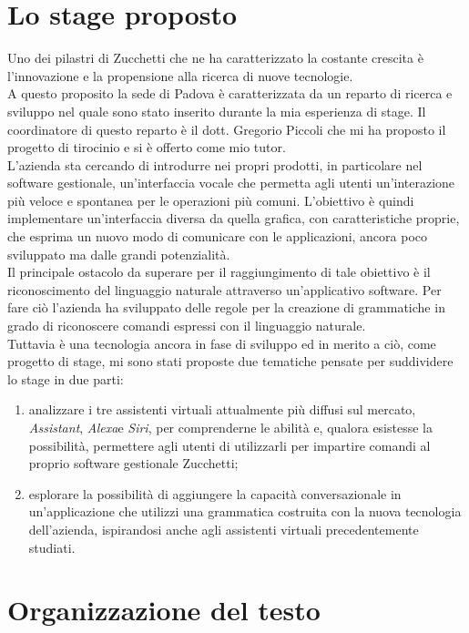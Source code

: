 \section{Lo stage proposto}
Uno dei pilastri di Zucchetti che ne ha caratterizzato la costante crescita è l'innovazione e la propensione alla ricerca di nuove tecnologie. \\
A questo proposito la sede di Padova è caratterizzata da un reparto di ricerca e sviluppo nel quale sono stato inserito durante la mia esperienza di stage. Il coordinatore di questo reparto è il dott. Gregorio Piccoli che mi ha proposto il progetto di tirocinio e si è offerto come mio tutor. \\
L'azienda sta cercando di introdurre nei propri prodotti, in particolare nel software gestionale, un'interfaccia vocale che permetta agli utenti un'interazione più veloce e spontanea per le operazioni più comuni. L'obiettivo è quindi implementare un'interfaccia diversa da quella grafica, con caratteristiche proprie, che esprima un nuovo modo di comunicare con le applicazioni, ancora poco sviluppato ma dalle grandi potenzialità. \\
Il principale ostacolo da superare per il raggiungimento di tale obiettivo è il riconoscimento del linguaggio naturale attraverso un'applicativo software. Per fare ciò l'azienda ha sviluppato delle regole per la creazione di grammatiche in grado di riconoscere comandi espressi con il linguaggio naturale. \\
Tuttavia è una tecnologia ancora in fase di sviluppo ed in merito a ciò, come progetto di stage, mi sono stati proposte due tematiche pensate per suddividere lo stage in due parti:
\begin{enumerate}
	\item analizzare i tre assistenti virtuali attualmente più diffusi sul mercato, \emph{Assistant}\glsfirstoccur, \emph{Alexa}\glsfirstoccur e \emph{Siri}\glsfirstoccur, per comprenderne le abilità e, qualora esistesse la possibilità, permettere agli utenti di utilizzarli per impartire comandi al proprio software gestionale Zucchetti;
	\item esplorare la possibilità di aggiungere la capacità conversazionale in un'applicazione che utilizzi una grammatica costruita con la nuova tecnologia dell'azienda, ispirandosi anche agli assistenti virtuali precedentemente studiati.
\end{enumerate}

\section{Organizzazione del testo}

